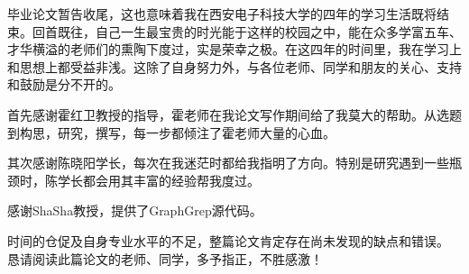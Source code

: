 \documentclass{XDBAthesis}
\begin{document}
\else
\fi

\begin{thanks}

毕业论文暂告收尾，这也意味着我在西安电子科技大学的四年的学习生活既将结束。回首既往，自己一生最宝贵的时光能于这样的校园之中，能在众多学富五车、才华横溢的老师们的熏陶下度过，实是荣幸之极。在这四年的时间里，我在学习上和思想上都受益非浅。这除了自身努力外，与各位老师、同学和朋友的关心、支持和鼓励是分不开的。

首先感谢霍红卫教授的指导，霍老师在我论文写作期间给了我莫大的帮助。从选题到构思，研究，撰写，每一步都倾注了霍老师大量的心血。

其次感谢陈晓阳学长，每次在我迷茫时都给我指明了方向。特别是研究遇到一些瓶颈时，陈学长都会用其丰富的经验帮我度过。

感谢ShaSha教授，提供了GraphGrep源代码。

时间的仓促及自身专业水平的不足，整篇论文肯定存在尚未发现的缺点和错误。
恳请阅读此篇论文的老师、同学，多予指正，不胜感激！


\end{thanks}

\ifx\allfiles\undefined
%

\end{document}
